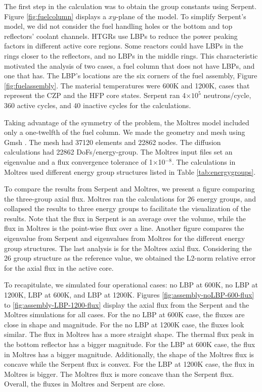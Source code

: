 \documentclass[11pt,letterpaper]{article}
\begin{document}
The first step in the calculation was to obtain the group constants using Serpent.
Figure \ref{fig:fuelcolumn} displays a $xy$-plane of the model.
To simplify Serpent's model, we did not consider the fuel handling holes or the bottom and top reflectors' coolant channels.
\glspl{HTGR} use \glspl{LBP} to reduce the power peaking factors in different active core regions.
Some reactors could have \glspl{LBP} in the rings closer to the reflectors, and no \glspl{LBP} in the middle rings.
This characteristic motivated the analysis of two cases, a fuel column that does not have \glspl{LBP}, and one that has.
The LBP's locations are the six corners of the fuel assembly, Figure \ref{fig:fuelassembly}.
The material temperatures were 600K and 1200K, cases that represent the \gls{CZP} and the \gls{HFP} core states.
Serpent ran 4$\times 10^5$ neutrons/cycle, 360 active cycles, and 40 inactive cycles for the calculations.

Taking advantage of the symmetry of the problem, the Moltres model included only a one-twelfth of the fuel column.
We made the geometry and mesh using Gmsh \cite{geuzaine_gmsh_2020}.
The mesh had 37120 elements and 22862 nodes.
The diffusion calculations had 22862 \glspl{DoF}/energy-group.
The Moltres input files set an eigenvalue and a flux convergence tolerance of 1$\times$10$^{-8}$.
The calculations in Moltres used different energy group structures listed in Table \ref{tab:energygroups}.

To compare the results from Serpent and Moltres, we present a figure comparing the three-group axial flux.
Moltres ran the calculations for 26 energy groups, and collapsed the results to three energy groups to facilitate the visualization of the results.
Note that the flux in Serpent is an average over the volume, while the flux in Moltres is the point-wise flux over a line.
Another figure compares the eigenvalue from Serpent and eigenvalues from Moltres for the different energy group structures.
The last analysis is for the Moltres axial flux.
Considering the 26 group structure as the reference value, we obtained the L2-norm relative error for the axial flux in the active core.

To recapitulate, we simulated four operational cases: no \gls{LBP} at 600K, no \gls{LBP} at 1200K, \gls{LBP} at 600K, and \gls{LBP} at 1200K.
Figures \ref{fig:assembly-noLBP-600-flux} to \ref{fig:assembly-LBP-1200-flux} display the axial flux from the Serpent and the Moltres simulations for all cases.
For the no LBP at 600K case, the fluxes are close in shape and magnitude.
For the no LBP at 1200K case, the fluxes look similar.
The flux in Moltres has a more straight shape.
The thermal flux peak in the bottom reflector has a bigger magnitude.
For the LBP at 600K case, the flux in Moltres has a bigger magnitude.
Additionally, the shape of the Moltres flux is concave while the Serpent flux is convex.
For the LBP at 1200K case, the flux in Moltres is bigger.
The Moltres flux is more concave than the Serpent flux.
Overall, the fluxes in Moltres and Serpent are close.
\end{document}
